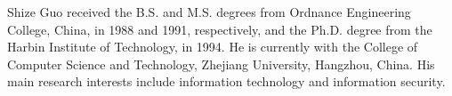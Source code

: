 \begin{IEEEbiography}
{Shize Guo} received the B.S. and M.S. degrees from Ordnance Engineering College, China, in 1988 and 1991, respectively, and the Ph.D. degree from the Harbin Institute of Technology, in 1994. He is currently with the College of Computer Science and Technology, Zhejiang University, Hangzhou, China. His main research interests include information technology and information security.
\end{IEEEbiography}

\vfill